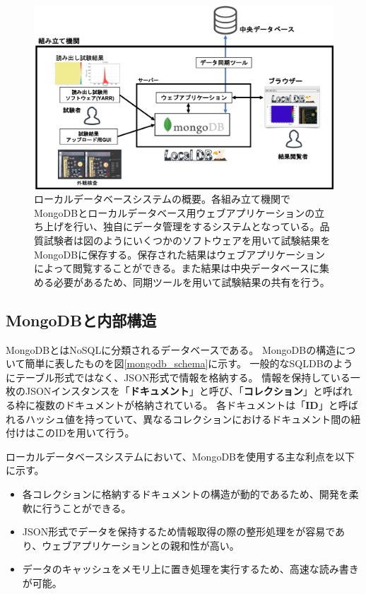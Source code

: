 \begin{figure}[bpt]\centering
\includegraphics[width=13cm]{localdb_overview}
\caption[ローカルデータベースシステムの概要]{ローカルデータベースシステムの概要。各組み立て機関でMongoDBとローカルデータベース用ウェブアプリケーションの立ち上げを行い、独自にデータ管理をするシステムとなっている。品質試験者は図のようにいくつかのソフトウェアを用いて試験結果をMongoDBに保存する。保存された結果はウェブアプリケーションによって閲覧することができる。また結果は中央データベースに集める必要があるため、同期ツールを用いて試験結果の共有を行う。}
\label{localdb_overview}
\end{figure}

\clearpage
\subsection{MongoDBと内部構造\cite{4-2}}
MongoDBとはNoSQLに分類されるデータベースである。
MongoDBの構造について簡単に表したものを図\ref{mongodb_schema}に示す。
一般的なSQLDBのようにテーブル形式ではなく、JSON形式で情報を格納する。
情報を保持している一枚のJSONインスタンスを「\textbf{ドキュメント}」と呼び、「\textbf{コレクション}」と呼ばれる枠に複数のドキュメントが格納されている。
各ドキュメントは「\textbf{ID}」と呼ばれるハッシュ値を持っていて、異なるコレクションにおけるドキュメント間の紐付けはこのIDを用いて行う。

ローカルデータベースシステムにおいて、MongoDBを使用する主な利点を以下に示す。

\begin{itemize}
  \item 各コレクションに格納するドキュメントの構造が動的であるため、開発を柔軟に行うことができる。
  \item JSON形式でデータを保持するため情報取得の際の整形処理をが容易であり、ウェブアプリケーションとの親和性が高い。
  \item データのキャッシュをメモリ上に置き処理を実行するため、高速な読み書きが可能。
\end{itemize}

